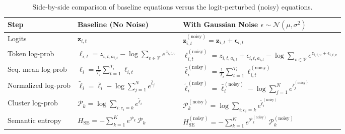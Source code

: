 \documentclass{article}
\begin{document}
\begin{table}[h]
\centering
\small
\begin{tabular}{p{} p{} p{}}
\toprule
\textbf{Step} & \textbf{Baseline (No Noise)} & \textbf{With Gaussian Noise $\epsilon \sim \mathcal{N}(\mu,\sigma^2)$} \\
\midrule
Logits & $\boldsymbol{z}_{i,t}$ & $\boldsymbol{z}_{i,t}^{(\text{noisy})} = \boldsymbol{z}_{i,t} + \boldsymbol{\epsilon}_{i,t}$ \\
Token log-prob & $\ell_{i,t} = z_{i,t,a_{i,t}} - \log \sum_{v \in \mathcal{V}} e^{z_{i,t,v}}$ & $\ell_{i,t}^{(\text{noisy})} = z_{i,t,a_{i,t}} + \epsilon_{i,t,a_{i,t}} - \log \sum_{v \in \mathcal{V}} e^{z_{i,t,v}+\epsilon_{i,t,v}}$ \\
Seq. mean log-prob & $\bar{\ell}_i = \frac{1}{T_i} \sum_{t=1}^{T_i} \ell_{i,t}$ & $\bar{\ell}_i^{(\text{noisy})} = \frac{1}{T_i} \sum_{t=1}^{T_i} \ell_{i,t}^{(\text{noisy})}$ \\
Normalized log-prob & $\tilde{\ell}_i = \bar{\ell}_i - \log \sum_{j=1}^{N} e^{\bar{\ell}_j}$ & $\tilde{\ell}_i^{(\text{noisy})} = \bar{\ell}_i^{(\text{noisy})} - \log \sum_{j=1}^{N} e^{\bar{\ell}_j^{(\text{noisy})}}$ \\
Cluster log-prob & $\mathcal{P}_k = \log \sum_{i: c_i = k} e^{\tilde{\ell}_i}$ & $\mathcal{P}_k^{(\text{noisy})} = \log \sum_{i: c_i = k} e^{\tilde{\ell}_i^{(\text{noisy})}}$ \\
Semantic entropy & $H_{\text{SE}} = -\sum_{k=1}^{K} e^{\mathcal{P}_k} \, \mathcal{P}_k$ & $H_{\text{SE}}^{(\text{noisy})} = -\sum_{k=1}^{K} e^{\mathcal{P}_k^{(\text{noisy})}} \, \mathcal{P}_k^{(\text{noisy})}$ \\
\bottomrule
\end{tabular}
\caption{Side-by-side comparison of baseline equations versus the logit-perturbed (noisy) equations.}
\label{tab:baseline_vs_noisy}
\end{table}
\end{document}

